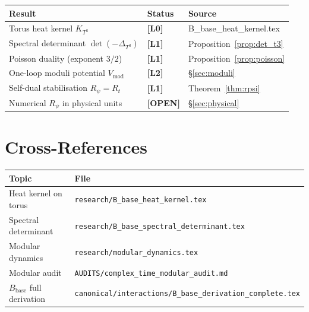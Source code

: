 \documentclass[11pt,a4paper]{article}
\newcommand{\Lzero}{\textbf{[L0]}}
\newcommand{\Lone}{\textbf{[L1]}}
\newcommand{\Ltwo}{\textbf{[L2]}}
\newcommand{\OPEN}{\textbf{[OPEN]}}
\begin{document}
\begin{center}
\begin{tabular}{lll}
\hline
Result & Status & Source \\
\hline
Torus heat kernel $K_{T^3}$ & \Lzero & B\_base\_heat\_kernel.tex \\
Spectral determinant $\det(-\Delta_{T^3})$ & \Lone & Proposition~\ref{prop:det_t3} \\
Poisson duality (exponent $3/2$) & \Lone & Proposition~\ref{prop:poisson} \\
One-loop moduli potential $V_{\mathrm{mod}}$ & \Ltwo & §\ref{sec:moduli} \\
Self-dual stabilisation $R_\psi=R_t$ & \Lone & Theorem~\ref{thm:rpsi} \\
Numerical $R_\psi$ in physical units & \OPEN & §\ref{sec:physical} \\
\hline
\end{tabular}
\end{center}

\section{Cross-References}
\label{sec:xref}

\begin{tabular}{ll}
\hline
Topic & File \\
\hline
Heat kernel on torus & \texttt{research/B\_base\_heat\_kernel.tex} \\
Spectral determinant & \texttt{research/B\_base\_spectral\_determinant.tex} \\
Modular dynamics & \texttt{research/modular\_dynamics.tex} \\
Modular audit & \texttt{AUDITS/complex\_time\_modular\_audit.md} \\
$B_{\mathrm{base}}$ full derivation & \texttt{canonical/interactions/B\_base\_derivation\_complete.tex} \\
\hline
\end{tabular}
\end{document}
